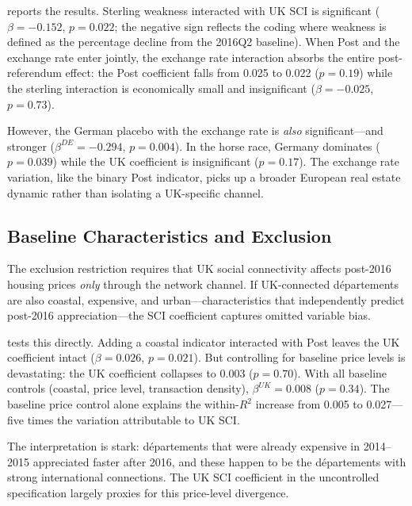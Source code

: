 \documentclass[12pt]{article}
\begin{document}
 reports the results. Sterling weakness interacted with UK SCI is significant ($\beta = -0.152$, $p = 0.022$; the negative sign reflects the coding where weakness is defined as the percentage decline from the 2016Q2 baseline). When Post and the exchange rate enter jointly, the exchange rate interaction absorbs the entire post-referendum effect: the Post coefficient falls from 0.025 to 0.022 ($p = 0.19$) while the sterling interaction is economically small and insignificant ($\beta = -0.025$, $p = 0.73$).

However, the German placebo with the exchange rate is \textit{also} significant---and stronger ($\beta^{DE} = -0.294$, $p = 0.004$). In the horse race, Germany dominates ($p = 0.039$) while the UK coefficient is insignificant ($p = 0.17$). The exchange rate variation, like the binary Post indicator, picks up a broader European real estate dynamic rather than isolating a UK-specific channel.



\subsection{Baseline Characteristics and Exclusion}

The exclusion restriction requires that UK social connectivity affects post-2016 housing prices \textit{only} through the network channel. If UK-connected d\'epartements are also coastal, expensive, and urban---characteristics that independently predict post-2016 appreciation---the SCI coefficient captures omitted variable bias.

 tests this directly. Adding a coastal indicator interacted with Post leaves the UK coefficient intact ($\beta = 0.026$, $p = 0.021$). But controlling for baseline price levels is devastating: the UK coefficient collapses to 0.003 ($p = 0.70$). With all baseline controls (coastal, price level, transaction density), $\beta^{UK} = 0.008$ ($p = 0.34$). The baseline price control alone explains the within-$R^2$ increase from 0.005 to 0.027---five times the variation attributable to UK SCI.

The interpretation is stark: d\'epartements that were already expensive in 2014--2015 appreciated faster after 2016, and these happen to be the d\'epartements with strong international connections. The UK SCI coefficient in the uncontrolled specification largely proxies for this price-level divergence.
\end{document}
